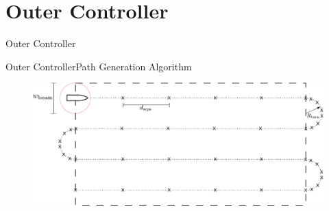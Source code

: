 \section{Outer Controller}

\begin{frame}{Outer Controller}{}

\end{frame}

\begin{frame}{Outer Controller}{Path Generation Algorithm}
    \begin{figure}[H]
        \centering
        \includegraphics[width=1\textwidth]{figures/pathGen} 
    \end{figure}       
\end{frame}

